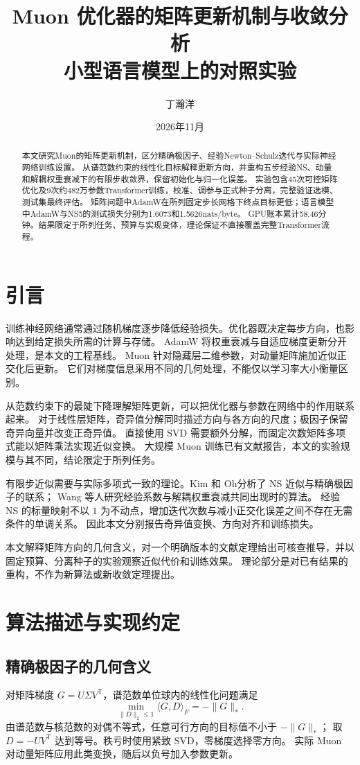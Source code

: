 \documentclass[UTF8,a4paper,11pt]{ctexart}
\title{Muon 优化器的矩阵更新机制与收敛分析\\[0.3em]小型语言模型上的对照实验}
\author{丁瀚洋}
\date{2026年11月}
\begin{document}
\maketitle
\begin{abstract}
本文研究Muon的矩阵更新机制，区分精确极因子、经验Newton--Schulz迭代与实际神经网络训练设置。
从谱范数约束的线性化目标解释更新方向，并重构五步经验NS、动量和解耦权重衰减下的有限步收敛界，保留初始化与归一化误差。
实验包含45次可控矩阵优化及9次约482万参数Transformer训练，校准、调参与正式种子分离，完整验证选模、测试集最终评估。
矩阵问题中AdamW在所列固定步长网格下终点目标更低；语言模型中AdamW与NS5的测试损失分别为1.6073和1.5626nats/byte。
GPU账本累计58.46分钟。结果限定于所列任务、预算与实现变体，理论保证不直接覆盖完整Transformer流程。
\end{abstract}
\section{引言}
训练神经网络通常通过随机梯度逐步降低经验损失。优化器既决定每步方向，也影响达到给定损失所需的计算与存储。
AdamW 将权重衰减与自适应梯度更新分开处理\cite{loshchilov2019adamw}，是本文的工程基线。
Muon 针对隐藏层二维参数，对动量矩阵施加近似正交化后更新\cite{jordan2024muon}。
它们对梯度信息采用不同的几何处理，不能仅以学习率大小衡量区别。

从范数约束下的最陡下降理解矩阵更新，可以把优化器与参数在网络中的作用联系起来\cite{bernstein2024norm}。
对于线性层矩阵，奇异值分解同时描述方向与各方向的尺度；极因子保留奇异向量并改变正奇异值。
直接使用 SVD 需要额外分解，而固定次数矩阵多项式能以矩阵乘法实现近似变换。
大规模 Muon 训练已有文献报告\cite{liu2025scalable}，本文的实验规模与其不同，结论限定于所列任务。

有限步近似需要与实际多项式一致的理论。Kim 和 Oh\cite{kim2026muonns}分析了 NS 近似与精确极因子的联系；
Wang 等人\cite{wang2026practical}研究经验系数与解耦权重衰减共同出现时的算法。
经验 NS 的标量映射不以 $1$ 为不动点，增加迭代次数与减小正交化误差之间不存在无需条件的单调关系。
因此本文分别报告奇异值变换、方向对齐和训练损失。

本文解释矩阵方向的几何含义，对一个明确版本的文献定理给出可核查推导，并以固定预算、分离种子的实验观察近似代价和训练效果。
理论部分是对已有结果的重构，不作为新算法或新收敛定理提出。

\section{算法描述与实现约定}\label{sec:implementation}
\subsection{精确极因子的几何含义}
对矩阵梯度 $G=U\Sigma V^{\mathsf T}$，谱范数单位球内的线性化问题满足
\[
 \min_{\|D\|_2\le1}\langle G,D\rangle_F=-\|G\|_*.
\]
由谱范数与核范数的对偶不等式，任意可行方向的目标值不小于 $-\|G\|_*$；
取 $D=-UV^{\mathsf T}$ 达到等号。秩亏时使用紧致 SVD，零梯度选择零方向。
实际 Muon 对动量矩阵应用此类变换，随后以负号加入参数更新。
\end{document}
